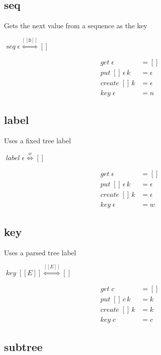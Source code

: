 \documentclass{amsart}
\newcommand{\ensmath}[1]{\ensuremath{#1}\xspace}
\newcommand{\opnam}[1]{\ensmath{\operatorname{\mathit{#1}}}}
\newcommand{\nkey}{\opnam{key}}
\newcommand{\lget}[1]{\opnam{get}{#1}}
\newcommand{\lput}[3]{\opnam{put}{#1}\,{#2}\,{#3}}
\newcommand{\lcreate}[2]{\opnam{create}{#1}\,{#2}}
\newcommand{\lkey}[1]{\nkey{#1}}
\newcommand{\lenstype}[3][K]{\ensmath{{#2}\stackrel{#1}{\Longleftrightarrow}{#3}}}
\newcommand{\niltree}{\ensmath{[]}}
\newcommand{\Regexp}{\ensmath{\mathcal R}}
\newcommand{\reglang}[1]{\ensmath{[\![{#1}]\!]}}
\newcommand{\lens}[1]{\opnam{#1}}
\newcommand{\eps}{\ensmath{\epsilon}}
\newcommand{\redigits}{\ensmath{\mathtt{D}}}
\begin{document}
\subsection{seq}

Gets the next value from a sequence as the key

        {\lens{seq}\in\lenstype[\reglang{\redigits}]{\eps}{\niltree}}

\begin{align*}
  \lget{\eps} &= \niltree\\
  \lput{\niltree}{\eps}{k} &= \eps\\
  \lcreate{\niltree}{k} &= \eps\\
  \lkey{\eps} &= n
\end{align*}

\subsection{label}

Uses a fixed tree label

        {\lens{label}\in\lenstype[w]{\eps}{\niltree}}

\begin{align*}
  \lget{\eps} &= \niltree\\
  \lput{\niltree}{\eps}{k} &= \eps\\
  \lcreate{\niltree}{k} &= \eps\\
  \lkey{\eps} &= w
\end{align*}

\subsection{key}

Uses a parsed tree label

\infrule{E\in\Regexp}
        {\lens{key}\in\lenstype[\reglang{E}]{\reglang{E}}{\niltree}}

\begin{align*}
  \lget{c} &= \niltree\\
  \lput{\niltree}{c}{k} &= k\\
  \lcreate{\niltree}{k} &= k\\
  \lkey{c} &= c
\end{align*}

\subsection{subtree}
\end{document}

